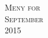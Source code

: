 \documentclass[landscape,a4paper]{article}
\begin{document}
\pagestyle{empty} %

\noindent



\begin{center}
\textsc{\LARGE Meny for}\\
\textsc{\LARGE September}\\ %
\textsc{\large 2015} %
\end{center}

\end{document}

